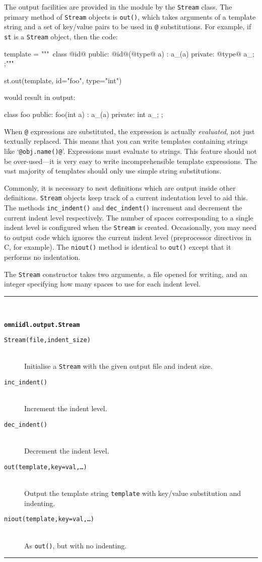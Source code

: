 \documentclass[11pt,twoside,a4paper]{article}
\newcommand{\func}[1]{\texttt{#1}}
\newcommand{\var}[1]{\texttt{#1}}
\newcommand{\class}[1]{\texttt{#1}}
\newcommand{\dfunc}[1]{\item[\func{#1}]\mbox{}\\}
\newenvironment{funcdesc}[1]%
  {\vspace{\baselineskip}%
   \noindent\begin{minipage}{\textwidth}%
   \noindent\rule{\textwidth}{1.5pt}\\%
   \centerline{\textbf{\texttt{#1}}}%
   \vspace{-.5\baselineskip}%
   \begin{description}}
  {\vspace{-\baselineskip}\end{description}%
   \noindent\rule{\textwidth}{1.5pt}\end{minipage}}
\newcommand{\file}{\begingroup \urlstyle{tt}\Url}
\begin{document}
The output facilities are provided in the \file{omniidl.output} module
by the \class{Stream} class. The primary method of \class{Stream}
objects is \func{out()}, which takes arguments of a template string
and a set of key/value pairs to be used in \texttt{@} substitutions.
For example, if \var{st} is a \class{Stream} object, then the code:

\begin{pylisting}
    template = """\
  class @id@ {
  public:
    @id@(@type@ a) : a_(a) {}
  private:
    @type@ a_;
  };"""

    st.out(template, id="foo", type="int")
\end{pylisting}


\noindent would result in output:

\begin{cxxlisting}
  class foo {
  public:
    foo(int a) : a_(a) {}
  private:
    int a_;
  };
\end{cxxlisting}


When \texttt{@} expressions are substituted, the expression is
actually \emph{evaluated}, not just textually replaced. This means
that you can write templates containing strings like
`\texttt{@obj.name()@}'. Expressions must evaluate to strings. This
feature should not be over-used---it is very easy to write
incomprehensible template expressions. The vast majority of templates
should only use simple string substitutions.

Commonly, it is necessary to nest definitions which are output inside
other definitions. \class{Stream} objects keep track of a current
indentation level to aid this. The methods \func{inc\_indent()} and
\func{dec\_indent()} increment and decrement the current indent level
respectively. The number of spaces corresponding to a single indent
level is configured when the \class{Stream} is created. Occasionally,
you may need to output code which ignores the current indent level
(preprocessor directives in C, for example). The \func{niout()} method
is identical to \func{out()} except that it performs no indentation.

The \class{Stream} constructor takes two arguments, a file opened for
writing, and an integer specifying how many spaces to use for each
indent level.


\begin{funcdesc}{omniidl.output.Stream}

\dfunc{Stream(file,indent\_size)}
  Initialise a \class{Stream} with the given output file and indent
  size.

\dfunc{inc\_indent()}
  Increment the indent level.

\dfunc{dec\_indent()}
  Decrement the indent level.

\dfunc{out(template,key=val,\dots)}
  Output the template string \var{template} with key/value
  substitution and indenting.

\dfunc{niout(template,key=val,\dots)}
  As \func{out()}, but with no indenting.

\end{funcdesc}
\end{document}

